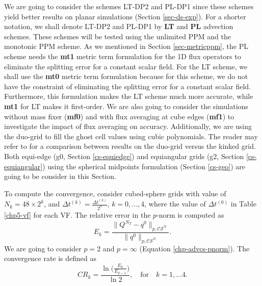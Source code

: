 We are going to consider the schemes LT-DP2 and PL-DP1 since these schemes yield better results on planar simulations (Section \ref{sec-ds-exp}).
For a shorter notation, we shall denote LT-DP2 and PL-DP1 by \textbf{LT} and \textbf{PL} advection schemes. 
These schemes will be tested using the unlimited PPM  and the monotonic PPM scheme.
As we mentioned in Section \ref{sec-metricppm}, the PL scheme needs the \textbf{mt1} 
metric term formulation for the 1D flux operators to eliminate the splitting error for a constant scalar field.
For the LT scheme, we shall use the \textbf{mt0} metric term formulation because for this scheme, 
we do not have the constraint of eliminating the splitting error for a constant scalar field. 
Furthermore, this formulation makes the LT scheme much more accurate, while \textbf{mt1} for LT makes it first-order.
We are also going to consider the simulations without mass fixer (\textbf{mf0}) and with flux averaging at
cube edges (\textbf{mf1}) to investigate the impact of flux averaging on accuracy.
Additionally, we are using the duo-grid to fill the ghost cell values using cubic polynomials.
The reader may refer to \citet{mouallem:2023} for a comparison between results on the duo-grid versus the kinked grid.
Both equi-edge (g0, Section \ref{cs-equiedge}) and equiangular grids (g2, Section \ref{cs-equiangular})
using the spherical midpoints formulation (Section \ref{cs-geo}) are going to be consider in this Section.

To compute the convergence, consider cubed-sphere grids with value of $N_k =  48\times2^{k}$,
and $\Delta t^{(k)} = \frac{\Delta t^{(k)}}{2^k}$, $k=0, \ldots, 4$, where
the value of $\Delta t^{(0)}$ in Table \ref{chp5-vf} for each VF.
The relative error in the $p$-norm is computed as
\begin{equation}
	E_k = 
	\frac{\| Q^{N_T} - q^0 \|_{p, \mathcal{CS}^N}}{\|q^0\|_{p,\mathcal{CS}^N}}.
\end{equation}
We are going to consider $p=2$ and $p=\infty$ (Equation \eqref{chp-advcs-pnorm}).
The convergence rate is defined as
\begin{equation*}
	CR_k = \frac{\ln{\bigg(\frac{E_{k}}{E_{k-1}}}\bigg)}{\ln 2}, \quad \text{for} \quad k = 1, \ldots 4.
\end{equation*}

\newpage
